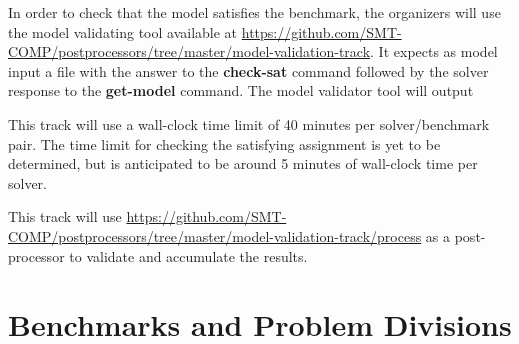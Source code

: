\documentclass[12pt]{article}
\newcommand{\akey}[1]{\textbf{#1}\xspace}
\begin{document}
In order to check that the model satisfies the benchmark, the organizers will
use the model validating tool available at
{\url{https://github.com/SMT-COMP/postprocessors/tree/master/model-validation-track}}.
It expects as model input a file with the answer to the \akey{check-sat}
command followed by the solver response to the \akey{get-model} command.
The model validator tool will output 

This track will use a wall-clock time limit of 40 minutes per solver/benchmark
pair. The time limit for checking the satisfying assignment is yet to be
determined, but is anticipated to be around 5 minutes of wall-clock time per
solver.

This track will use
{\url{https://github.com/SMT-COMP/postprocessors/tree/master/model-validation-track/process}}
as a post-processor
to validate and accumulate the results.


\section{Benchmarks and Problem Divisions}
\end{document}
